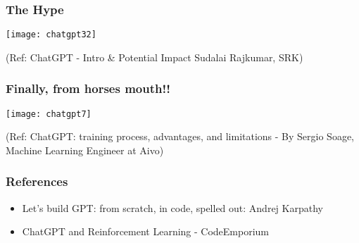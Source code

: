 \begin{frame}[fragile]\frametitle{The Hype}


\begin{center}
\texttt{[image: chatgpt32]}
\end{center}		

{\tiny (Ref: ChatGPT - Intro \& Potential Impact Sudalai Rajkumar, SRK)}
			

\end{frame}

\begin{frame}[fragile]\frametitle{Finally, from horses mouth!!}


\begin{center}
\texttt{[image: chatgpt7]}
\end{center}		

{\tiny (Ref: ChatGPT: training process, advantages, and limitations - By Sergio Soage, Machine Learning Engineer at Aivo)}
			

\end{frame}





			



\begin{frame}[fragile]\frametitle{References}
		\begin{itemize}
		\item Let's build GPT: from scratch, in code, spelled out: Andrej Karpathy
		\item ChatGPT and Reinforcement Learning - CodeEmporium
		\end{itemize}
\end{frame}
